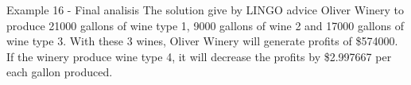 \begin{frame}{Example 16 - Final analisis}
The solution give by LINGO advice Oliver Winery to produce 21000 gallons
of wine type 1, 9000 gallons of wine 2 and 17000 gallons of wine type 3. With
these 3 wines, Oliver Winery will generate profits of \$574000. If the winery produce
wine type 4, it will decrease the profits by \$2.997667 per each gallon produced.
\end{frame}
